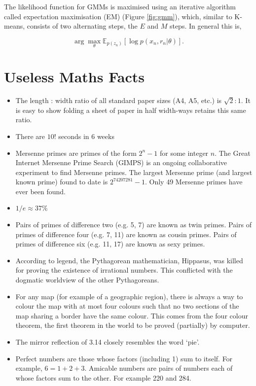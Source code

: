 \documentclass[11pt]{amsart}
\begin{document}
The likelihood function for GMMs is maximised using an iterative algorithm called expectation maximisation (EM) (Figure \ref{fig:gmm}), which, similar to K-means, consists of two alternating steps, the $E$ and $M$ steps. In general this is,

$$\arg \max_\theta \mathbb{E}_{p(z_n)}[\log p(x_n, r_n | \theta)].$$

\section{Useless Maths Facts}

\begin{itemize}
\item The length : width ratio of all standard paper sizes (A4, A5, etc.) is $\sqrt{2}:1$. It is easy to show folding a sheet of paper in half width-ways retains this same ratio. 
\item There are $10!$ seconds in 6 weeks
\item Mersenne primes are primes of the form $2^n - 1$ for some integer $n$. The Great Internet Mersenne Prime Search (GIMPS) is an ongoing collaborative experiment to find Mersenne primes. The largest Mersenne prime (and largest known prime) found to date is $2^{74207281} - 1$. Only 49 Mersenne primes have ever been found.
\item $1/e \approx 37\%$
\item Pairs of primes of difference two (e.g. 5, 7) are known as twin primes. Pairs of primes of difference four (e.g. 7, 11) are known as cousin primes. Pairs of primes of difference six (e.g. 11, 17) are known as sexy primes.
\item According to legend, the Pythagorean mathematician, Hippasus, was killed for proving the existence of irrational numbers. This conflicted with the dogmatic worldview of the other Pythagoreans.
\item For any map (for example of a geographic region), there is always a way to colour the map with at most four colours such that no two sections of the map sharing a border have the same colour. This comes from the four colour theorem, the first theorem in the world to be proved (partially) by computer.
\item The mirror reflection of 3.14 closely resembles the word `pie'.
\item Perfect numbers are those whose factors (including 1) sum to itself. For example, $6 = 1 + 2 + 3$. Amicable numbers are pairs of numbers each of whose factors sum to the other. For example 220 and 284.

\end{itemize}
\end{document}
